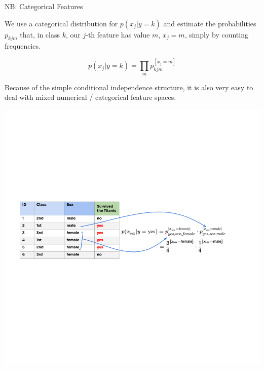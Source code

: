 \documentclass[11pt,compress,t,notes=noshow, xcolor=table]{beamer}
\begin{document}
\begin{frame}{NB: Categorical Features}

We use a categorical distribution for $p(x_j | y = k)$ and estimate the probabilities $p_{kjm}$ that, in class $k$, our $j$-th feature has value $m$, $x_j = m$, simply by counting  frequencies.

$$
p(x_j | y = k) = \prod_m p_{kjm}^{[x_j = m]}
$$

Because of the simple conditional independence structure, it is also very easy to deal with mixed numerical / categorical feature spaces.

\begin{flushright}
\includegraphics[width=\textwidth, clip = true, trim = {50 410 120 350}]{figure_man/nb-categorial_final.png}
\end{flushright}

\end{frame}
\end{document}
